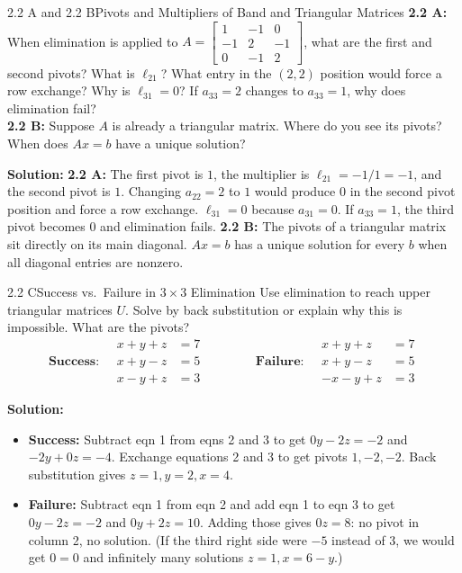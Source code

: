 \documentclass[11pt,a4paper,openany,oneside]{book}
\def\vect#1{#1}%
\def\mathbf#1{#1}%
\newcommand{\vect}[1]{\mathbf{#1}}
\numberwithin{equation}{chapter}
\begin{document}
\begin{example}{2.2 A and 2.2 B}{Pivots and Multipliers of Band and Triangular Matrices}
\textbf{2.2 A:} When elimination is applied to $A = \begin{bmatrix}1 & -1 & 0\\-1 & 2 & -1\\0 & -1 & 2\end{bmatrix}$, what are the first and second pivots? What is $\ell_{21}$? What entry in the $(2,2)$ position would force a row exchange? Why is $\ell_{31}=0$? If $a_{33}=2$ changes to $a_{33}=1$, why does elimination fail?\\
\textbf{2.2 B:} Suppose $A$ is already a triangular matrix. Where do you see its pivots? When does $A\vect{x}=\vect{b}$ have a unique solution?
\end{example}
\textbf{Solution:}
\textbf{2.2 A:} The first pivot is $1$, the multiplier is $\ell_{21} = -1/1 = -1$, and the second pivot is $1$. Changing $a_{22}=2$ to $1$ would produce $0$ in the second pivot position and force a row exchange. $\ell_{31}=0$ because $a_{31}=0$. If $a_{33}=1$, the third pivot becomes $0$ and elimination fails.
\textbf{2.2 B:} The pivots of a triangular matrix sit directly on its main diagonal. $A\vect{x}=\vect{b}$ has a unique solution for every $\vect{b}$ when all diagonal entries are nonzero.

\begin{example}{2.2 C}{Success vs.\ Failure in $3\times 3$ Elimination}
Use elimination to reach upper triangular matrices $U$. Solve by back substitution or explain why this is impossible. What are the pivots?
\[
\textbf{Success:} \quad \begin{aligned} x+y+z &= 7 \\ x+y-z &= 5 \\ x-y+z &= 3 \end{aligned} \qquad\qquad
\textbf{Failure:} \quad \begin{aligned} x+y+z &= 7 \\ x+y-z &= 5 \\ -x-y+z &= 3 \end{aligned}
\]
\end{example}
\textbf{Solution:}
\begin{itemize}
\item \textbf{Success:} Subtract eqn 1 from eqns 2 and 3 to get $0y - 2z = -2$ and $-2y + 0z = -4$. Exchange equations 2 and 3 to get pivots $1, -2, -2$. Back substitution gives $z=1, y=2, x=4$.
\item \textbf{Failure:} Subtract eqn 1 from eqn 2 and add eqn 1 to eqn 3 to get $0y - 2z = -2$ and $0y + 2z = 10$. Adding those gives $0z = 8$: no pivot in column 2, no solution. (If the third right side were $-5$ instead of $3$, we would get $0=0$ and infinitely many solutions $z=1, x=6-y$.)
\end{itemize}
\end{document}
